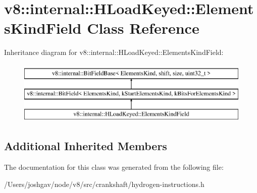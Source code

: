 \hypertarget{classv8_1_1internal_1_1_h_load_keyed_1_1_elements_kind_field}{}\section{v8\+:\+:internal\+:\+:H\+Load\+Keyed\+:\+:Elements\+Kind\+Field Class Reference}
\label{classv8_1_1internal_1_1_h_load_keyed_1_1_elements_kind_field}
Inheritance diagram for v8\+:\+:internal\+:\+:H\+Load\+Keyed\+:\+:Elements\+Kind\+Field\+:\begin{figure}[H]
\begin{center}
\leavevmode
\includegraphics[height=3.000000cm]{classv8_1_1internal_1_1_h_load_keyed_1_1_elements_kind_field}
\end{center}
\end{figure}
\subsection*{Additional Inherited Members}


The documentation for this class was generated from the following file\+:\begin{DoxyCompactItemize}
\item 
/\+Users/joshgav/node/v8/src/crankshaft/hydrogen-\/instructions.\+h\end{DoxyCompactItemize}
